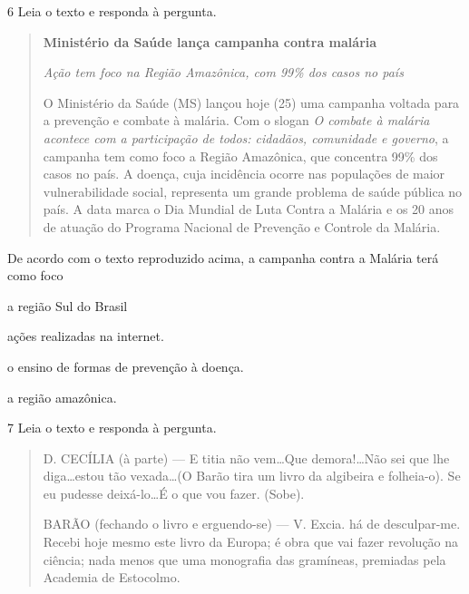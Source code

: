 \num{6} Leia o texto e responda à pergunta.

\begin{quote}
\textbf{Ministério da Saúde lança campanha contra malária}

\textit{Ação tem foco na Região Amazônica, com 99\% dos casos no país}

O Ministério da Saúde (MS) lançou hoje (25) uma campanha voltada para a
prevenção e combate à malária. Com o slogan \textit{O combate à malária acontece
com a participação de todos: cidadãos, comunidade e governo}, a campanha
tem como foco a Região Amazônica, que concentra 99\% dos casos no país. A
doença, cuja incidência ocorre nas populações de maior vulnerabilidade
social, representa um grande problema de saúde pública no país. A data
marca o Dia Mundial de Luta Contra a Malária e os 20 anos de atuação do
Programa Nacional de Prevenção e Controle da Malária.
\end{quote}


De acordo com o texto reproduzido acima, a campanha contra a Malária
terá como foco

\begin{escolha}
  \item a região Sul do Brasil

  \item ações realizadas na internet.

  \item o ensino de formas de prevenção à doença.

  \item a região amazônica.
\end{escolha}

\num{7} Leia o texto e responda à pergunta.

\begin{quote}
D. CECÍLIA (à parte) --- E titia não vem\ldots Que demora!\ldots Não sei
que lhe diga\ldots estou tão vexada\ldots (O Barão tira um livro da algibeira
e folheia-o). Se eu pudesse deixá-lo\ldots É o que vou fazer. (Sobe).

BARÃO (fechando o livro e erguendo-se) --- V. Excia. há de desculpar-me.
Recebi hoje mesmo este livro da Europa; é obra que vai fazer revolução na
ciência; nada menos que uma monografia das gramíneas, premiadas pela 
Academia de Estocolmo.
\end{quote}

